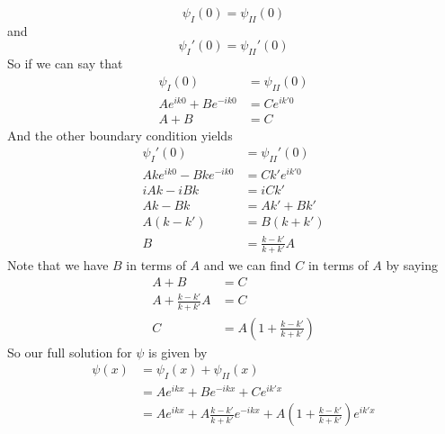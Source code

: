 \documentclass[11pt]{article}
\numberwithin{equation}{section}
\begin{document}
\begin{enumerate}[(a)]
$$\psi_I(0) = \psi_{II}(0)$$
and 
$$\psi_I'(0) = \psi_{II}'(0)$$
So if we can say that
\begin{align*}
\psi_I(0) &= \psi_{II}(0)\\
Ae^{ik0}+Be^{-ik0} &= Ce^{ik'0}\\
A+B &= C
\end{align*}
And the other boundary condition yields 
\begin{align*}
\psi_I'(0) &= \psi_{II}'(0)\\
Ake^{ik0}-Bke^{-ik0} &= Ck'e^{ik'0}\\
iAk-iBk &= iCk'\\
Ak-Bk &= Ak'+Bk'\\
A(k-k') &= B(k+k')\\
B &= \frac{k-k'}{k+k'}A
\end{align*}
Note that we have $B$ in terms of $A$ and we can find $C$ in terms of $A$ by saying
\begin{align*}
A+B &= C\\
A+\frac{k-k'}{k+k'}A &= C\\
C &= A\left(1+\frac{k-k'}{k+k'}\right)
\end{align*}
So our full solution for $\psi$ is given by
\begin{align*}
\psi(x) &= \psi_I(x)+\psi_{II}(x)\\
&= Ae^{ikx}+Be^{-ikx}+Ce^{ik'x}\\
&= Ae^{ikx}+A\frac{k-k'}{k+k'}e^{-ikx}+A\left(1+\frac{k-k'}{k+k'}\right)e^{ik'x}
\end{align*}


\end{enumerate}
\end{document}
